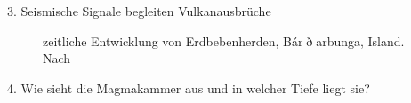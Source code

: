 \documentclass[xcolor=dvipsnames]{beamer}
\begin{document}
\begin{frame}[t]{}
\begin{minipage}[t]{0.6\textwidth}
\begin{block}{\LARGE 3. Seismische Signale begleiten Vulkanausbrüche}
\begin{figure}
   \centering
      \captionsetup{justification=centering}
   \caption{\Large zeitliche Entwicklung von Erdbebenherden, Bár$\eth$arbunga, Island. Nach \cite{Eibl2017b}}
   
  \end{figure}
%  
%  
  \end{block}
  \end{minipage}
  \begin{block}{\LARGE 4. Wie sieht die Magmakammer aus und in welcher Tiefe liegt sie?}
  \vskip 5mm
  \begin{minipage}{0.27\textwidth}
  \begin{figure}

\end{figure}
\end{minipage}
\end{block}
\end{frame}
\end{document}
